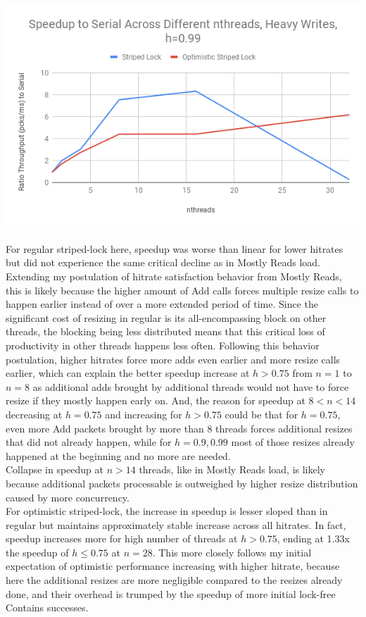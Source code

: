 \documentclass{article}
\begin{document}
\begin{adjustwidth}{-2cm}{-2cm}
\includegraphics[width=\linewidth]{e3_45_99_graph.png}\\ \null\\
For regular striped-lock here, speedup was worse than linear for lower hitrates but did not experience the same critical decline as in Mostly Reads load. Extending my postulation of hitrate satisfaction behavior from Mostly Reads, this is likely because the higher amount of Add calls forces multiple resize calls to happen earlier instead of over a more extended period of time. Since the significant cost of resizing in regular is its all-encompassing block on other threads, the blocking being less distributed means that this critical loss of productivity in other threads happens less often. Following this behavior postulation, higher hitrates force more adds even earlier and more resize calls earlier, which can explain the better speedup increase at $h>0.75$ from $n=1$ to $n=8$ as additional adds brought by additional threads would not have to force resize if they mostly happen early on. And, the reason for speedup at $8<n<14$ decreasing at $h=0.75$ and increasing for $h>0.75$ could be that for $h=0.75$, even more Add packets brought by more than 8 threads forces additional resizes that did not already happen, while for $h=0.9, 0.99$ most of those resizes already happened at the beginning and no more are needed.\\
Collapse in speedup at $n>14$ threads, like in Mostly Reads load, is likely because additional packets processable is outweighed by higher resize distribution caused by more concurrency.\\
For optimistic striped-lock, the increase in speedup is lesser sloped than in regular but maintains approximately stable increase across all hitrates. In fact, speedup increases more for high number of threads at $h>0.75$, ending at 1.33x the speedup of $h\leq0.75$ at $n=28$. This more closely follows my initial expectation of optimistic performance increasing with higher hitrate, because here the additional resizes are more negligible compared to the resizes already done, and their overhead is trumped by the speedup of more initial lock-free Contains successes.\\

\end{adjustwidth}
\end{document}
